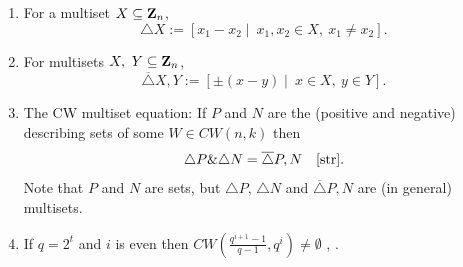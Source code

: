 {\begin{enumerate}
    \item For a multiset $X \subseteq {\bf Z}_{n}$, 
	  $$\triangle X:=[x_1-x_2 \mid \ x_1,x_2 \in X, \  x_1 \neq x_2].$$
    
    \item For multisets $X, \ Y \subseteq {\bf Z}_{n}$, 
	  $$\overline{\triangle} X,Y:= [\pm(x-y) \mid \ x \in X, \ y \in Y].$$
    
    \item \label{eq_p_n}
	The CW multiset equation: If 
	$P$ and $N$ are the (positive and negative) describing sets of some
	$W \in CW(n,k)$ then 
	$$\triangle P \& \triangle N= \overline{\triangle}P,N \quad \cite{str}.$$
	Note that $P$ and $N$ are sets, but 
	$\triangle P$, $\triangle N$ and $ \overline{\triangle}P,N$ 
	are (in general) multisets.

   \item  \label{adjpas} 
	If $q=2^t$ and $i$ is even then \-
	$CW(\frac{q^{i+1}-1}{q-1},q^i) \neq \emptyset$ \- \cite{adjp95}, 
	 \cite{as96}.


\end{enumerate}}
